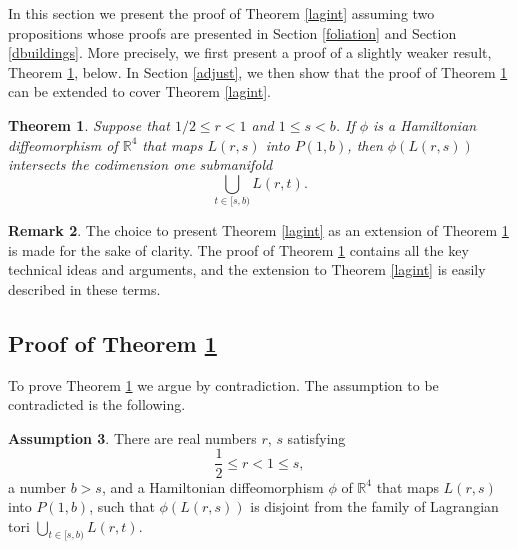\documentclass[12pt]{amsart}
\newtheorem{theorem}{Theorem}[section]
\theoremstyle{definition}
\newtheorem{assumption}[theorem]{Assumption}
\newtheorem{remark}[theorem]{Remark}
\newcommand{\RR}{{\mathbb R}}
\begin{document}
In this section we present the proof of Theorem \ref{lagint} assuming two propositions whose proofs are presented in Section \ref{foliation} and Section \ref{dbuildings}. More precisely, we first present a proof of a slightly weaker result, Theorem \ref{center}, below. In Section \ref{adjust}, we then show that the proof of Theorem \ref{center} can be extended to cover Theorem \ref{lagint}.
\begin{theorem}\label{center}
Suppose that  $1/2\leq r<1$ and $1 \leq s <b$. If $\phi$ is a Hamiltonian diffeomorphism of $\RR^4$ that maps $L(r,s)$ into $P(1,b)$, then $\phi(L(r,s))$ intersects the codimension one submanifold
\begin{equation*} 
\bigcup_{t \in [s,b)} L(r, t).
\end{equation*}
\end{theorem}


\begin{remark}
    The choice to present Theorem \ref{lagint} as an extension of Theorem \ref{center} is made for the sake of clarity. The proof of Theorem \ref{center} contains all the key technical ideas and arguments, and the extension to Theorem \ref{lagint} is easily described in these terms. 
\end{remark}

\subsection{Proof of Theorem \ref{center}}

To prove Theorem \ref{center} we argue by contradiction. The assumption to be contradicted is the following.

\begin{assumption}\label{assump}
There are real numbers $r$, $s$ satisfying 
\[ \frac{1}{2} \leq r <1 \leq s,\]
a number $b>s$, and a Hamiltonian diffeomorphism $\phi$ of $\RR^4$ that maps $L(r,s)$ into $P(1,b)$, such that  $\phi(L(r,s))$ is disjoint from the family of Lagrangian tori $\bigcup_{t \in [s,b)} L(r, t)$.
\end{assumption}

\bigskip
\end{document}
